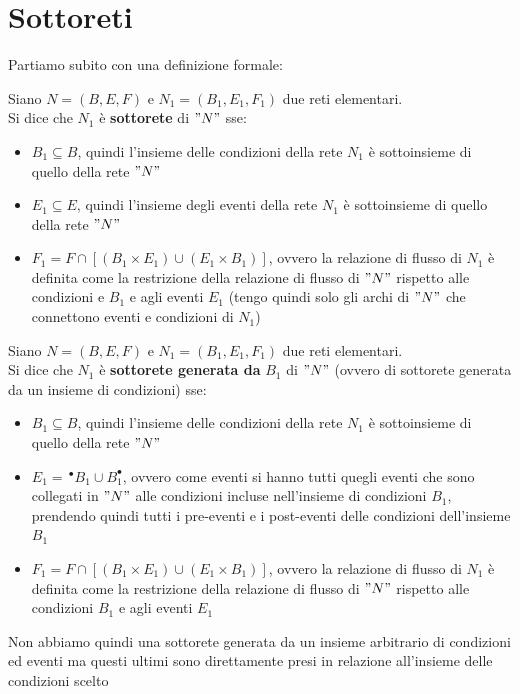 \section{Sottoreti}
Partiamo subito con una definizione formale:
\begin{definizione}
  Siano $N=(B, E, F)$ e $N_1=(B_1, E_1, F_1)$ due reti elementari.\\
  Si dice che $N_1$ è \textbf{sottorete} di $"N"$ sse:
  \begin{itemize}
    \item $B_1\subseteq B$, quindi l'insieme delle condizioni della rete $N_1$
    è sottoinsieme di quello della rete $"N"$
    \item $E_1\subseteq E$, quindi l'insieme degli eventi della rete $N_1$
    è sottoinsieme di quello della rete $"N"$
    \item $F_1=F\cap[(B_1\times E_1)\cup (E_1\times B_1)]$, ovvero la relazione
    di flusso di $N_1$ è definita come la restrizione della relazione di flusso
    di $"N"$ rispetto alle condizioni e $B_1$ e agli eventi $E_1$ (tengo quindi
    solo gli archi di $"N"$ che connettono eventi e condizioni di $N_1$)
  \end{itemize}
\end{definizione} \vspace{5mm} %
\begin{definizione}
  Siano $N=(B, E, F)$ e $N_1=(B_1, E_1, F_1)$ due reti elementari.\\
  Si dice che $N_1$ è \textbf{sottorete generata da} $B_1$ di $"N"$ (ovvero di
  sottorete generata da un insieme di condizioni) sse:
  \begin{itemize}
    \item $B_1\subseteq B$, quindi l'insieme delle condizioni della rete $N_1$
    è sottoinsieme di quello della rete $"N"$
    \item $E_1=\, ^\bullet B_1\cup B_1^\bullet$, ovvero come eventi si
    hanno tutti quegli eventi che sono collegati in $"N"$ alle condizioni incluse
    nell'insieme di condizioni $B_1$, prendendo quindi tutti i pre-eventi e i
    post-eventi delle condizioni dell'insieme $B_1$
    \item $F_1=F\cap[(B_1\times E_1)\cup (E_1\times B_1)]$, ovvero la relazione
    di flusso di $N_1$ è definita come la restrizione della relazione di flusso
    di $"N"$ rispetto alle condizioni $B_1$ e agli eventi $E_1$
  \end{itemize}
  Non abbiamo quindi una sottorete generata da un insieme arbitrario di condizioni ed
  eventi ma questi ultimi sono direttamente presi in relazione all'insieme delle
  condizioni scelto
\end{definizione} \vspace{5mm} %
